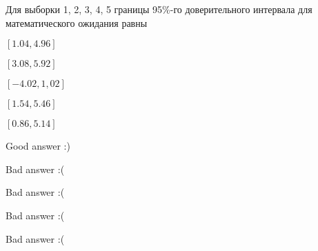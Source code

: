 
\begin{question}
Для выборки 1, 2, 3, 4, 5 границы 95\%-го доверительного интервала для
математического ожидания равны
\begin{answerlist}
  \item \([1.04, 4.96]\)
  \item \([3.08, 5.92]\)
  \item \([-4.02, 1,02]\)
  \item \([1.54, 5.46]\)
  \item \([0.86, 5.14]\)
\end{answerlist}
\end{question}

\begin{solution}
\begin{answerlist}
  \item Good answer :)
  \item Bad answer :(
  \item Bad answer :(
  \item Bad answer :(
  \item Bad answer :(
\end{answerlist}
\end{solution}

